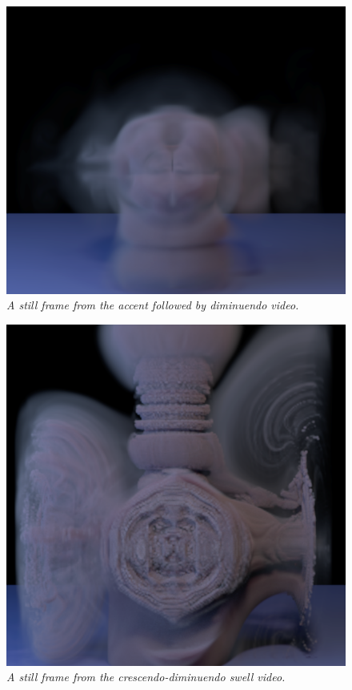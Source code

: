 \begin{figure}[H]
	\centering
	\includegraphics[width=\textwidth]{chap6/figures/dim.png}
	\caption{\em A still frame from the accent followed by diminuendo video.}
\label{fig:dim}
\end{figure}

\begin{figure}[H]
	\centering
	\includegraphics[width=\textwidth]{chap6/figures/swell.png}
	\caption{\em A still frame from the crescendo-diminuendo swell video.}
\label{fig:swell}
\end{figure}

